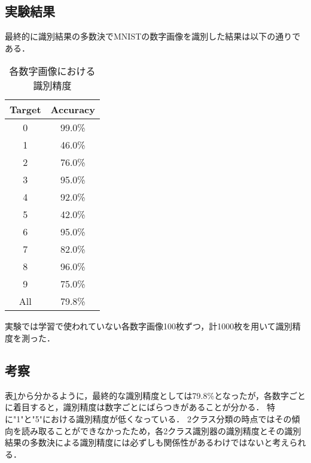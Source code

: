 \subsection*{実験結果}
最終的に識別結果の多数決でMNISTの数字画像を識別した結果は以下の通りである．
\begin{table}[H]
    \begin{center}
        \begin{tabular}{cc}
            \hline
            Target & Accuracy\\
            \hline \hline
            0 & 99.0\%\\
            1 & 46.0\%\\
            2 & 76.0\%\\
            3 & 95.0\%\\
            4 & 92.0\%\\
            5 & 42.0\%\\
            6 & 95.0\%\\
            7 & 82.0\%\\
            8 & 96.0\%\\
            9 & 75.0\%\\
            All & 79.8\%\\
            \hline
        \end{tabular}
        \caption{各数字画像における識別精度}
        \label{result}
    \end{center}
\end{table}
実験では学習で使われていない各数字画像100枚ずつ，計1000枚を用いて識別精度を測った．

\subsection*{考察}
表\ref{result}から分かるように，最終的な識別精度としては79.8\%となったが，各数字ごとに着目すると，識別精度は数字ごとにばらつきがあることが分かる．
特に"1"と"5"における識別精度が低くなっている．
2クラス分類の時点ではその傾向を読み取ることができなかったため，各2クラス識別器の識別精度とその識別結果の多数決による識別精度には必ずしも関係性があるわけではないと考えられる．